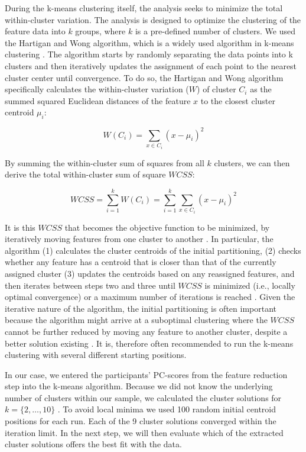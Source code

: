 During the k-means clustering itself, the analysis seeks to minimize the
total within-cluster variation. The analysis is designed to optimize the
clustering of the feature data into \(k\) groups, where \(k\) is a
pre-defined number of clusters. We used the Hartigan and Wong algorithm,
which is a widely used algorithm in k-means clustering
\citep{hartigan1979}. The algorithm starts by randomly separating the
data points into k clusters and then iteratively updates the assignment
of each point to the nearest cluster center until convergence. To do so,
the Hartigan and Wong algorithm specifically calculates the
within-cluster variation (\(W\)) of cluster \(C_i\) as the summed
squared Euclidean distances of the feature \(x\) to the closest cluster
centroid \(\mu_i\):

\begin{equation} \label{eq:kWCi}
  W(C_i) = \sum_{x \in C_i}(x-\mu_i)^2
\end{equation}

By summing the within-cluster sum of squares from all \(k\) clusters, we
can then derive the total within-cluster sum of square \(WCSS\):

\begin{equation} \label{eq:kWCSS}
  WCSS = \sum_{i=1}^k W(C_i) = \sum_{i=1}^k \sum_{x \in C_i} (x - \mu_i)^2
\end{equation}

It is this \(WCSS\) that becomes the objective function to be minimized,
by iteratively moving features from one cluster to another
\citep{hartigan1979}. In particular, the algorithm (1) calculates the
cluster centroids of the initial partitioning, (2) checks whether any
feature has a centroid that is closer than that of the currently
assigned cluster (3) updates the centroids based on any reassigned
features, and then iterates between steps two and three until \(WCSS\)
is minimized (i.e., locally optimal convergence) or a maximum number of
iterations is reached \citep{jain2010}. Given the iterative nature of
the algorithm, the initial partitioning is often important because the
algorithm might arrive at a suboptimal clustering where the \(WCSS\)
cannot be further reduced by moving any feature to another cluster,
despite a better solution existing
\citep[i.e., a local minimum;][]{timmerman2013}. It is, therefore often
recommended to run the k-means clustering with several different
starting positions.

In our case, we entered the participants' PC-scores from the feature
reduction step into the k-means algorithm. Because we did not know the
underlying number of clusters within our sample, we calculated the
cluster solutions for \(k=\{2, \dots , 10\}\) . To avoid local minima we
used 100 random initial centroid positions for each run. Each of the 9
cluster solutions converged within the iteration limit. In the next
step, we will then evaluate which of the extracted cluster solutions
offers the best fit with the data.
